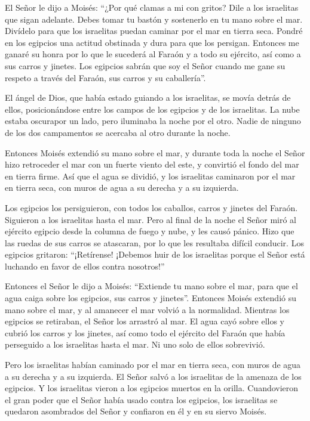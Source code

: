  El Señor le dijo a Moisés: ``¿Por qué clamas a mi con
gritos? Dile a los israelitas que sigan adelante.  Debes
tomar tu bastón y sostenerlo en tu mano sobre el mar. Divídelo para que
los israelitas puedan caminar por el mar en tierra seca. 
Pondré en los egipcios una actitud obstinada y dura para que los
persigan. Entonces me ganaré su honra por lo que le sucederá al Faraón y
a todo su ejército, así como a sus carros y jinetes.  Los
egipcios sabrán que soy el Señor cuando me gane su respeto a través del
Faraón, sus carros y su caballería''.

 El ángel de Dios, que había estado guiando a los
israelitas, se movía detrás de ellos,  posicionándose entre
los campos de los egipcios y de los israelitas. La nube estaba oscurapor
un lado, pero iluminaba la noche por el otro. Nadie de ninguno de los
dos campamentos se acercaba al otro durante la noche.

 Entonces Moisés extendió su mano sobre el mar, y durante
toda la noche el Señor hizo retroceder el mar con un fuerte viento del
este, y convirtió el fondo del mar en tierra firme. Así que el agua se
dividió,  y los israelitas caminaron por el mar en tierra
seca, con muros de agua a su derecha y a su izquierda.

 Los egipcios los persiguieron, con todos los caballos,
carros y jinetes del Faraón. Siguieron a los israelitas hasta el mar.
 Pero al final de la noche el Señor miró al ejército
egipcio desde la columna de fuego y nube, y les causó pánico.
 Hizo que las ruedas de sus carros se atascaran, por lo que
les resultaba difícil conducir. Los egipcios gritaron: ``¡Retírense!
¡Debemos huir de los israelitas porque el Señor está luchando en favor
de ellos contra nosotros!''

 Entonces el Señor le dijo a Moisés: ``Extiende tu mano
sobre el mar, para que el agua caiga sobre los egipcios, sus carros y
jinetes''.  Entonces Moisés extendió su mano sobre el mar,
y al amanecer el mar volvió a la normalidad. Mientras los egipcios se
retiraban, el Señor los arrastró al mar.  El agua cayó
sobre ellos y cubrió los carros y los jinetes, así como todo el ejército
del Faraón que había perseguido a los israelitas hasta el mar. Ni uno
solo de ellos sobrevivió.

 Pero los israelitas habían caminado por el mar en tierra
seca, con muros de agua a su derecha y a su izquierda.  El
Señor salvó a los israelitas de la amenaza de los egipcios. Y los
israelitas vieron a los egipcios muertos en la orilla. 
Cuandovieron el gran poder que el Señor había usado contra los egipcios,
los israelitas se quedaron asombrados del Señor y confiaron en él y en
su siervo Moisés.

